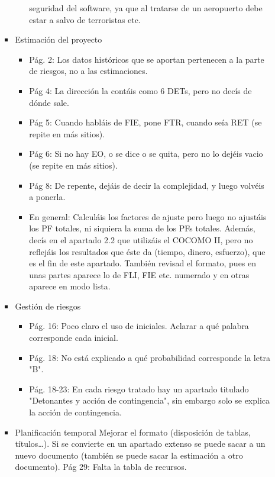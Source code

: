 \documentclass[11pt, a4paper, twoside, titlepage]{article}
\begin{document}
\begin{itemize}
\begin{itemize}
\begin{itemize}
\begin{itemize}
seguridad  del  software,  ya  que  al  tratarse  de  un  aeropuerto  debe   estar  a  salvo  de  terroristas  etc.  
								\end{itemize}
							\item Estimación del proyecto
								\begin{itemize}
								\item Pág.  2:  Los  datos  históricos  que  se  aportan  pertenecen  a  la  parte  de   riesgos,  no  a  las  estimaciones.   
								\item Pág  4:  La  dirección  la  contáis  como  6  DETs,  pero  no  decís  de dónde sale.  	
								\item Pág  5:  Cuando  habláis  de  FIE,  pone  FTR,  cuando  seía  RET  (se  repite  en  más  sitios).  
								\item Pág  6:  Si  no  hay  EO,  o  se  dice  o  se  quita,  pero  no  lo  dejéis  vacio  (se  repite  en  más  sitios).   
								\item Pág  8:  De  repente,  dejáis  de  decir  la  complejidad,  y  luego  volvéis  a  
ponerla.  
								\item En general: 
								Calculáis  los  factores  de  ajuste  pero  luego  no  ajustáis  los  PF  totales,  ni   siquiera  la  suma  de  los  PFs  totales.  Además,  decís  en  el  apartado  2.2   que  utilizáis  el  COCOMO  II,  pero  no  reflejáis  los  resultados  que  éste   da  (tiempo,  dinero,  esfuerzo),  que  es  el  fin  de  este  apartado.  También   revisad  el  formato,  pues  en  unas  partes  aparece  lo  de  FLI,  FIE  etc.   numerado  y  en  otras  aparece  en  modo  lista.  
								\end{itemize}
							\item Gestión de riesgos
								\begin{itemize}
								\item Pág.  16:  Poco  claro  el  uso  de  iniciales.  Aclarar  a  qué  palabra   corresponde  cada  inicial.  
								\item Pág.  18:  No  está  explicado  a  qué  probabilidad  corresponde  la  letra  
"B".  
								\item Pág.  18-23:  En  cada  riesgo  tratado  hay  un  apartado  titulado  
"Detonantes  y  acción  de  contingencia",  sin  embargo  solo  se  explica  la   acción  de  contingencia.
								\end{itemize}  
							\item Planificación temporal
								Mejorar  el  formato  (disposición  de  tablas,  títulos…).  Si  se  convierte   en  un  apartado  extenso  se  puede  sacar  a  un  nuevo  documento   (también  se  puede  sacar  la  estimación  a  otro  documento).   Pág  29:  Falta  la  tabla  de  recursos.    

\end{itemize}
\end{itemize}
\end{itemize}
\end{document}
